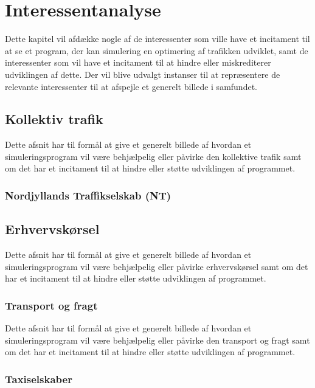 
\chapter{Interessentanalyse}

Dette kapitel vil afdække nogle af de interessenter som ville have et incitament til at se et program, der kan simulering en optimering af trafikken udviklet, samt de interessenter som vil have et incitament til at hindre eller miskrediterer udviklingen af dette. Der vil blive udvalgt instanser til at repræsentere de relevante interessenter til at afspejle et generelt billede i samfundet.

\section{Kollektiv trafik}

Dette afsnit har til formål at give et generelt billede af hvordan et simuleringsprogram vil være behjælpelig eller påvirke den kollektive trafik samt om det har et incitament til at hindre eller støtte udviklingen af programmet.

\subsection{Nordjyllands Traffikselskab (NT)}



\section{Erhvervskørsel}

Dette afsnit har til formål at give et generelt billede af hvordan et simuleringsprogram vil være behjælpelig eller påvirke erhvervskørsel samt om det har et incitament til at hindre eller støtte udviklingen af programmet.

\subsection{Transport og fragt}

Dette afsnit har til formål at give et generelt billede af hvordan et simuleringsprogram vil være behjælpelig eller påvirke den transport og fragt samt om det har et incitament til at hindre eller støtte udviklingen af programmet.

\subsection{Taxiselskaber}

